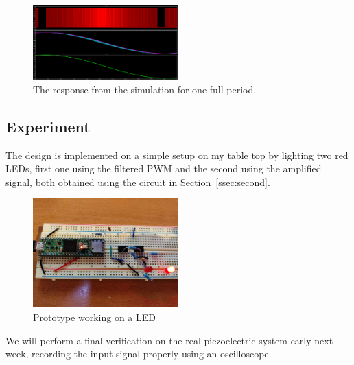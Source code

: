 \begin{figure}[t]
\includegraphics[width=0.5\textwidth]{./figures/pwm_filtered_one_two_final_signal.png}
\caption{The response from the simulation for one full period.} 
\label{fig:response}
\end{figure}


\vspace{-1em}
\subsection{Experiment}
\vspace{-1em}

The design is implemented on a simple setup on my table top by lighting two red
LEDs, first one using the filtered PWM and the second using the amplified
signal, both obtained using the circuit in Section~\ref{ssec:second}.

\begin{figure}[t]
\includegraphics[width=0.5\textwidth]{./figures/prototype.jpg}
\caption{Prototype working on a LED} 
\label{fig:exp}
\end{figure}

We will perform a final verification on the real piezoelectric system early next
week, recording the input signal properly using an oscilloscope.
